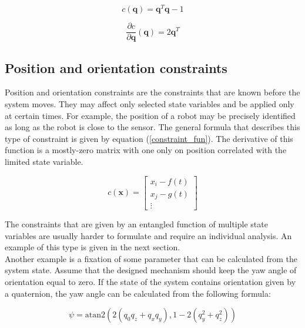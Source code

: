 \begin{equation}
	c \left( \bm{q} \right) = \bm{q}^T \bm{q} - 1
\label{quat_constraint_fun}
\end{equation}

\begin{equation}
	\frac{\partial c}{\partial \bm{q}}  \left( \bm{q} \right) = 2\bm{q}^T
	\label{quat_constraint_fun_der}
\end{equation}

\subsection{Position and orientation constraints}

Position and orientation constraints are the constraints that are known before the system moves. They may affect only selected state variables and be applied only at certain times. For example, the position of a robot may be precisely identified as long as the robot is close to the sensor. The general formula that describes this type of constraint is given by equation (\ref{constraint_fun}). The derivative of this function is a mostly-zero matrix with one only on position correlated with the limited state variable.

\begin{equation}
	c \left( \bm{x} \right) = \begin{bmatrix}
		x_i - f\left(t\right) \\
		x_j - g\left(t\right)\\
		\vdots
		\end{bmatrix}
	\label{constraint_fun}
\end{equation} 

The constraints that are given by an entangled function of multiple state variables are usually harder to formulate and require an individual analysis. An example of this type is given in the next section.\\

Another example is a fixation of some parameter that can be calculated from the system state. Assume that the designed mechanism should keep the yaw angle of orientation equal to zero. If the state of the system contains orientation given by a quaternion, the yaw angle can be calculated from the following formula:

\begin{equation}
	\psi = {\mbox{atan2}}\left(2(q_{0}q_{z}+q_{x}q_{y}),1-2(q_{y}^{2}+q_{z}^{2})\right)
\end{equation}

